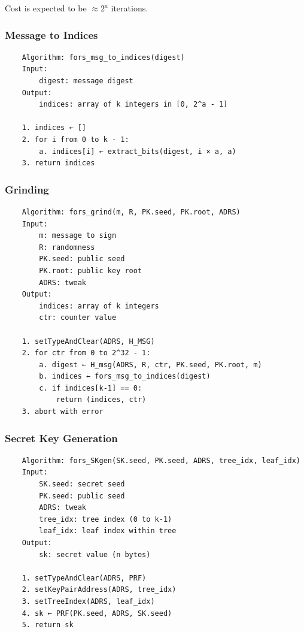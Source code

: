 Cost is expected to be $\approx 2^a$ iterations.

\subsubsection{Message to Indices}
\begin{verbatim}
    Algorithm: fors_msg_to_indices(digest)
    Input:
        digest: message digest
    Output:
        indices: array of k integers in [0, 2^a - 1]

    1. indices ← []
    2. for i from 0 to k - 1:
        a. indices[i] ← extract_bits(digest, i × a, a)
    3. return indices
\end{verbatim}

\subsubsection{Grinding}
\begin{verbatim}
    Algorithm: fors_grind(m, R, PK.seed, PK.root, ADRS)
    Input:
        m: message to sign
        R: randomness
        PK.seed: public seed
        PK.root: public key root
        ADRS: tweak
    Output:
        indices: array of k integers
        ctr: counter value

    1. setTypeAndClear(ADRS, H_MSG)
    2. for ctr from 0 to 2^32 - 1:
        a. digest ← H_msg(ADRS, R, ctr, PK.seed, PK.root, m)
        b. indices ← fors_msg_to_indices(digest)
        c. if indices[k-1] == 0:
            return (indices, ctr)
    3. abort with error
\end{verbatim}

\subsubsection{Secret Key Generation}
\begin{verbatim}
    Algorithm: fors_SKgen(SK.seed, PK.seed, ADRS, tree_idx, leaf_idx)
    Input:
        SK.seed: secret seed
        PK.seed: public seed
        ADRS: tweak
        tree_idx: tree index (0 to k-1)
        leaf_idx: leaf index within tree
    Output:
        sk: secret value (n bytes)

    1. setTypeAndClear(ADRS, PRF)
    2. setKeyPairAddress(ADRS, tree_idx)
    3. setTreeIndex(ADRS, leaf_idx)
    4. sk ← PRF(PK.seed, ADRS, SK.seed)
    5. return sk
\end{verbatim}

